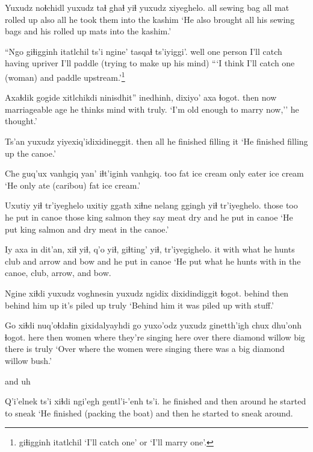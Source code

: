 \documentclass[12pt]{article}
\begin{document}
\gll Yuxudz noɬchidl   yuxudz taɬ ghaɬ      yiɬ yuxudz xiyeghelo.
all    {sewing bag} all    mat {rolled up} also all   {he took them into the kashim }
\glt `He also brought all his sewing bags and his rolled up mats into the kashim.'
\glend

\gll ``Ngo  giɬigginh itatlchil  ts'i ngine'  tasqaɬ      ts'iyiggi'.
well {one person} {I'll catch} having upriver {I'll paddle}  {(trying to make up his mind)}
\glt ```I think I'll catch one (woman) and paddle upstream.'\footnote{giɬigginh itatlchil `I'll catch one' or `I'll marry one'.}
\glend

\gll Axaɬdik gogide {xitlchikdi ninisdhit''} inedhinh, dixiyo' axa ɬogot.
then    now    {marriageable age} {he thinks} mind  with truly.
\glt `I'm old enough to marry now,'' he thought.' 
\glend

\gll Ts'an yuxudz yiyexiq'idixidineggit.
then  all    {he finished filling it}
\glt `He finished filling up the canoe.'
\glend

\gll Che guq'ux vanhgiq   yan' iɬt'iginh vanhgiq.
too fat    {ice cream} only   eater     {ice cream}
\glt `He only ate (caribou) fat ice cream.'
\glend
                       
\gll Uxutiy yiɬ tr'iyeghelo       uxitiy ggath       xiɬne    nelang ggingh yiɬ tr'iyeghelo.
those too     {he put in canoe} those  {king salmon} {they say} meat dry  and {he put in canoe}
\glt `He put king salmon and dry meat in the canoe.'
\glend

\gll Iy axa  {in dit'an,}      xiɬ  yiɬ, q'o   yiɬ, giɬting' yiɬ, tr'iyegighelo.
it with {what he hunts} club and  arrow and  bow      and {he put in canoe}
\glt `He put what he hunts with in the canoe, club, arrow, and bow.
\glend

\gll Ngine xiɬdi yuxudz voghnesin  yuxudz ngidix dixidindiggit ɬogot.
behind  then {}    {behind him} {}  up {it's piled up} truly
\glt `Behind him it was piled up with stuff.'
\glend

\gll Go   xiɬdi nuq'oɬdaɬin gixidalyayhdi          go   yuxo'odz yuxudz  ginetth'igh    chux dhu'onh ɬogot.
here then  women       {where they're singing}   here {over there} {} {diamond willow} big  {there is} truly
\glt `Over where the women were singing there was a big diamond willow bush.'
\glend

and uh

\gll Q'i'elnek ts'i xiɬdi ngi'egh gentl'i-'enh ts'i. 
{he finished} and then  around  {he started to sneak}
\glt `He finished (packing the boat) and then he started to sneak around.
\glend
\end{document}
